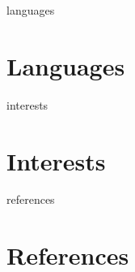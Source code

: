 \documentclass[12pt]{report} %
\begin{document}

\ifcsname languages\endcsname%
\section{Languages}
\languages{}
\fi



\ifcsname interests\endcsname%
\section{Interests}
\interests{}
\fi



\ifcsname references\endcsname%
\section{References}
\fi


\end{document}
